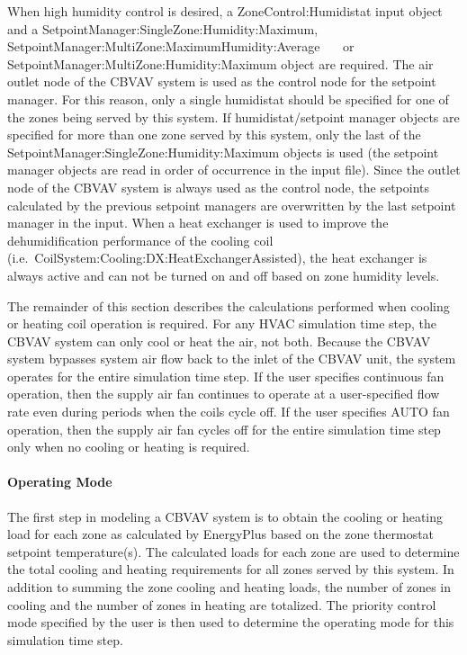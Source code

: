 When high humidity control is desired, a ZoneControl:Humidistat input object and a SetpointManager:SingleZone:Humidity:Maximum, SetpointManager:MultiZone:MaximumHumidity:Average~ ~~or SetpointManager:MultiZone:Humidity:Maximum object are required. The air outlet node of the CBVAV system is used as the control node for the setpoint manager. For this reason, only a single humidistat should be specified for one of the zones being served by this system. If humidistat/setpoint manager objects are specified for more than one zone served by this system, only the last of the SetpointManager:SingleZone:Humidity:Maximum objects is used (the setpoint manager objects are read in order of occurrence in the input file). Since the outlet node of the CBVAV system is always used as the control node, the setpoints calculated by the previous setpoint managers are overwritten by the last setpoint manager in the input. When a heat exchanger is used to improve the dehumidification performance of the cooling coil (i.e.~CoilSystem:Cooling:DX:HeatExchangerAssisted), the heat exchanger is always active and can not be turned on and off based on zone humidity levels.

The remainder of this section describes the calculations performed when cooling or heating coil operation is required. For any HVAC simulation time step, the CBVAV system can only cool or heat the air, not both. Because the CBVAV system bypasses system air flow back to the inlet of the CBVAV unit, the system operates for the entire simulation time step. If the user specifies continuous fan operation, then the supply air fan continues to operate at a user-specified flow rate even during periods when the coils cycle off. If the user specifies AUTO fan operation, then the supply air fan cycles off for the entire simulation time step only when no cooling or heating is required.

\paragraph{Operating Mode}\label{operating-mode}

The first step in modeling a CBVAV system is to obtain the cooling or heating load for each zone as calculated by EnergyPlus based on the zone thermostat setpoint temperature(s). The calculated loads for each zone are used to determine the total cooling and heating requirements for all zones served by this system. In addition to summing the zone cooling and heating loads, the number of zones in cooling and the number of zones in heating are totalized. The priority control mode specified by the user is then used to determine the operating mode for this simulation time step.

